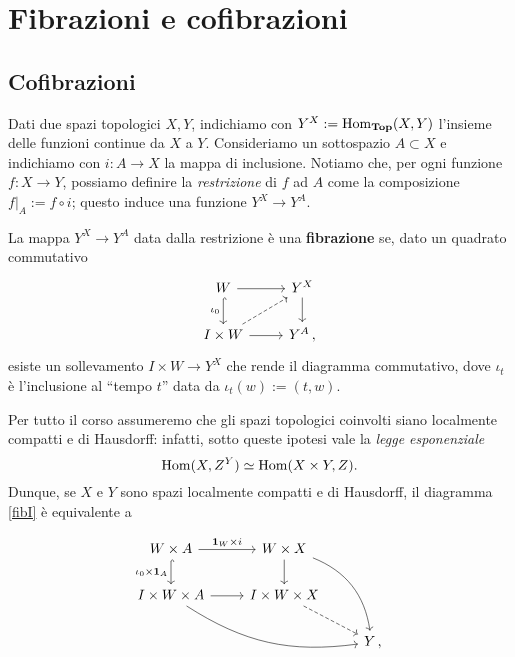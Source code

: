 
\chapter{Fibrazioni e cofibrazioni}

\section{Cofibrazioni}


Dati due spazi topologici $X,Y$, 
indichiamo con $Y^{X} := \operatorname{Hom}_{{\normalfont\textbf{Top}}}(X,Y)$
l'insieme delle funzioni continue da $X$ a $Y$.
Consideriamo un sottospazio $A \subset X$
e indichiamo con $i:A \to X$ la mappa di inclusione.
Notiamo che, per ogni funzione $f:X \to Y$,
possiamo definire la \emph{restrizione} di $f$ ad $A$
come la composizione $f\vert_{A} := f \circ i$;
questo induce una funzione $Y^{X} \to Y^{A}$.

\begin{df}
	La mappa $Y^{X} \to Y^{A}$ data dalla restrizione è una
	\textbf{fibrazione} se, dato un quadrato commutativo
	\begin{equation}\label{fibI}
		\begin{tikzcd}
			W \ar[r] \ar[d, hook, "\iota_{0}"'] & Y^{X} \ar[d] \\
			I \times W \ar[r] \ar[ur, dashed] & Y^{A}\,,
		\end{tikzcd}
	\end{equation}
	esiste un sollevamento $I \times W \to Y^{X}$ che rende
	il diagramma commutativo, dove $\iota_{t}$ è
	l'inclusione al ``tempo $t$'' data da $\iota_{t}(w) := (t,w)$.
\end{df}

Per tutto il corso assumeremo che gli spazi topologici coinvolti siano
localmente compatti e di Hausdorff:
infatti, sotto queste ipotesi vale la \emph{legge esponenziale}
\begin{equation*}
	\operatorname{Hom}(X,Z^{Y}) \simeq \operatorname{Hom}(X \times Y, Z).
\end{equation*}
Dunque, se $X$ e $Y$ sono spazi localmente compatti e di Hausdorff,
il diagramma \eqref{fibI} è equivalente a

	\begin{equation*} %
		\begin{tikzcd}
			W \times A  \ar[r, "\cat{1}_{W} \times i"]
			 \ar[d, hook, "\iota_{0} \times \cat{1}_{A}"'] 
			 & W \times X \ar[d]  \ar[ddr, bend left] & \\
			I \times W \times A \ar[r]  \ar[drr, bend right=20pt]
			& I \times W \times X \ar[dr, dashed] & \\
			& & Y \,,
		\end{tikzcd}
	\end{equation*}
	
